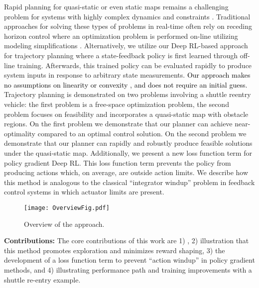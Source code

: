 \documentclass{UnderReview}
\begin{document}
Rapid planning for quasi-static or even static maps remains a challenging problem for systems with highly complex dynamics and constraints \cite{grant2016rapid}.  Traditional approaches for solving these types of problems in real-time often rely on receding horizon control where an optimization problem is performed on-line utilizing modeling simplifications \cite{kuwata2005robust}.  Alternatively, we utilize our Deep RL-based approach for trajectory planning where a state-feedback policy is first learned through off-line training.  Afterwards, this trained policy can be evaluated rapidly to produce system inputs in response to arbitrary state measurements.  \textcolor{black}{Our approach makes no assumptions on linearity or convexity \cite{malyuta2021convex}, and does not require an initial guess.}  Trajectory planning is demonstrated on two problems involving a shuttle reentry vehicle: the first problem is a free-space optimization problem, the second problem focuses on feasibility and incorporates a quasi-static map with obstacle regions.  On the first problem we demonstrate that our planner can achieve near-optimality compared to an optimal control solution.  On the second problem we demonstrate that our planner can rapidly and robustly produce feasible solutions under the quasi-static map.  Additionally, we present a new loss function term for policy gradient Deep RL.  This loss function term prevents the policy from producing actions which, on average, are outside action limits.  We describe how this method is analogous to the classical ``integrator windup'' problem in feedback control systems in which actuator limits are present. 
\begin{figure}%
	\centering
	\begin{minipage}{.5\textwidth}
		\texttt{[image: OverviewFig.pdf]}
	\end{minipage}
	\captionsetup{width=.49\textwidth}
	\caption{Overview of the approach.} 
	\label{fig:OverviewFig}
\end{figure}

\textbf{Contributions:}  The core contributions of this work are 1) , 2) illustration that this method promotes exploration and minimizes reward shaping, 3) the development of a loss function term to prevent ``action windup'' in policy gradient methods, and 4) illustrating performance path and training improvements with a shuttle re-entry example.  
\end{document}
